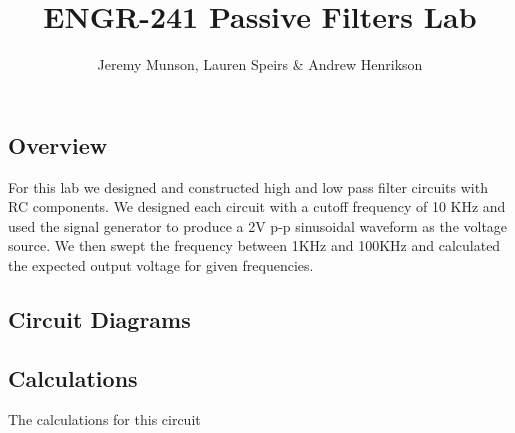 \documentclass[11pt]{article}
\title{ENGR-241 Passive Filters Lab}
\author{Jeremy Munson, Lauren Speirs \& Andrew Henrikson}
\begin{document}
	\maketitle
	\subsection*{Overview}
	For this lab we designed and  constructed high and low pass filter circuits with RC components. We designed each circuit with a cutoff frequency of 10 KHz and used the signal generator to produce a 2V p-p sinusoidal waveform as the voltage source. We then swept the frequency between 1KHz and 100KHz and calculated the expected output voltage for given frequencies.
	\subsection*{Circuit Diagrams}
	  
	\subsection*{Calculations}
	The calculations for this circuit 
\end{document}

